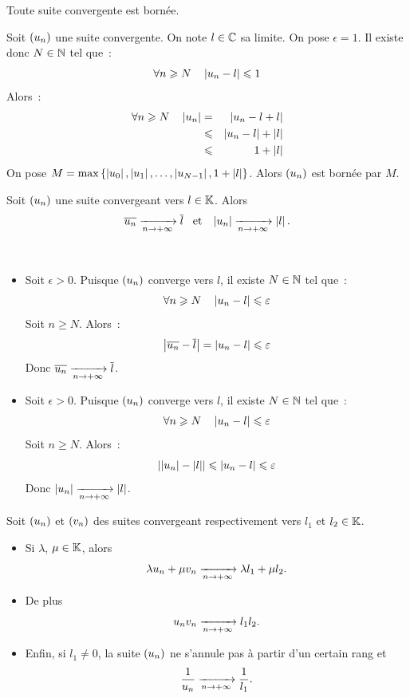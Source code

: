 \documentclass{magnolia}
\begin{document}

\begin{proposition}[utile=-3]
Toute suite convergente est bornée.  
\end{proposition}

\begin{preuve}
Soit $\left(u_n\right)$ une suite convergente. On note $l\in\mathbb{C}$ sa limite. On pose
$\epsilon=1$. Il existe donc $N\in\mathbb{N}$ tel que~:
\[\forall n\geqslant N \quad \left|u_n-l\right|\leqslant 1\]
Alors~:
\begin{eqnarray*}
\forall n\geqslant N \quad \left|u_n\right|  
&=& \left|u_n-l+l\right|\\
&\leqslant& \left|u_n-l\right|+\left|l\right|\\
&\leqslant& 1+\left|l\right|
\end{eqnarray*}
On pose $M=\max\left\{\left|u_0\right|,\left|u_1\right|,\ldots,\left|u_{N-1}\right|,1+\left|l\right|\right\}$. Alors
$\left(u_n\right)$ est bornée par $M$.
\end{preuve}

\begin{proposition}[utile=-3]
Soit $\left(u_n\right)$ une suite convergeant vers $l\in\mathbb{K}$. Alors
\[\overline{u_n}\xrightarrow[n\rightarrow +\infty]{}\overline{l} \quad\!\text{et}\quad\!
  \left|u_n\right|\xrightarrow[n\rightarrow +\infty]{} \left|l\right|.\]
\end{proposition}

\begin{preuve}
$\quad$
\begin{itemize}
\item Soit $\epsilon>0$. Puisque $\left(u_n\right)$ converge vers $l$, il existe
  $N\in\mathbb{N}$ tel que~:
  \[\forall n\geqslant N \quad \left|u_n-l\right|\leqslant\varepsilon\]
  Soit $n\geq N$. Alors~:
  \[\left|\overline{u_n}-\overline{l}\right|=\left|u_n-l\right|\leqslant\varepsilon\]
  Donc $\overline{u_n}\xrightarrow[n\rightarrow +\infty]{}\overline{l}$.
\item Soit $\epsilon>0$. Puisque $\left(u_n\right)$ converge vers $l$, il existe
  $N\in\mathbb{N}$ tel que~:
  \[\forall n\geqslant N \quad \left|u_n-l\right|\leqslant\varepsilon\]
  Soit $n\geq N$. Alors~:
  \[\left|\left|u_n\right|-\left|l\right|\right|\leqslant\left|u_n-l\right|\leqslant\varepsilon\]
  Donc $\left|u_n\right|\xrightarrow[n\rightarrow +\infty]{}\left|l\right|$.
\end{itemize}
\end{preuve}


\begin{proposition}[utile=-3]
Soit $\left(u_n\right)$ et $\left(v_n\right)$ des suites convergeant respectivement
vers $l_1$ et $l_2\in\mathbb{K}$.
\begin{itemize}
\item Si $\lambda$, $\mu\in\mathbb{K}$, alors
  \[\lambda u_n+\mu v_n \xrightarrow[n\rightarrow +\infty]{} \lambda l_1+\mu l_2.\]
\item De plus
  \[u_n v_n \xrightarrow[n\rightarrow +\infty]{} l_1 l_2.\]
\item Enfin, si $l_1\neq 0$, la suite $\left(u_n\right)$ ne s'annule pas à partir d'un
  certain rang et
  \[\frac{1}{u_n}\xrightarrow[n\rightarrow +\infty]{}\frac{1}{l_1}.\]
\end{itemize}
\end{proposition}
\end{document}
